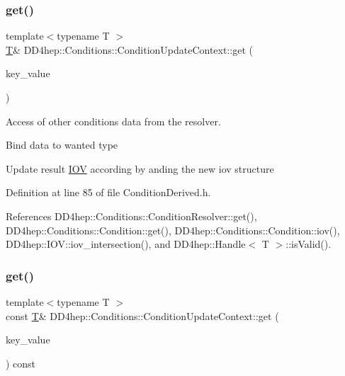 \subsubsection{\texorpdfstring{get()}{get()}\hspace{0.1cm}{\footnotesize\ttfamily [1/4]}}
{\footnotesize\ttfamily template$<$typename T $>$ \\
\hyperlink{class_t}{T}\& D\+D4hep\+::\+Conditions\+::\+Condition\+Update\+Context\+::get (\begin{DoxyParamCaption}\item[{const \hyperlink{class_d_d4hep_1_1_conditions_1_1_condition_key}{Condition\+Key} \&}]{key\+\_\+value }\end{DoxyParamCaption})\hspace{0.3cm}{\ttfamily [inline]}}



Access of other conditions data from the resolver. 

Bind data to wanted type

Update result \hyperlink{class_d_d4hep_1_1_i_o_v}{I\+OV} according by and\textquotesingle{}ing the new iov structure 

Definition at line 85 of file Condition\+Derived.\+h.



References D\+D4hep\+::\+Conditions\+::\+Condition\+Resolver\+::get(), D\+D4hep\+::\+Conditions\+::\+Condition\+::get(), D\+D4hep\+::\+Conditions\+::\+Condition\+::iov(), D\+D4hep\+::\+I\+O\+V\+::iov\+\_\+intersection(), and D\+D4hep\+::\+Handle$<$ T $>$\+::is\+Valid().

\hypertarget{class_d_d4hep_1_1_conditions_1_1_condition_update_context_a038d03fe818890783726b1e632f10d83}{}\label{class_d_d4hep_1_1_conditions_1_1_condition_update_context_a038d03fe818890783726b1e632f10d83} 
\subsubsection{\texorpdfstring{get()}{get()}\hspace{0.1cm}{\footnotesize\ttfamily [2/4]}}
{\footnotesize\ttfamily template$<$typename T $>$ \\
const \hyperlink{class_t}{T}\& D\+D4hep\+::\+Conditions\+::\+Condition\+Update\+Context\+::get (\begin{DoxyParamCaption}\item[{const \hyperlink{class_d_d4hep_1_1_conditions_1_1_condition_key}{Condition\+Key} \&}]{key\+\_\+value }\end{DoxyParamCaption}) const\hspace{0.3cm}{\ttfamily [inline]}}



